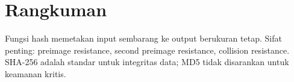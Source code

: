 \section*{Rangkuman}
Fungsi hash memetakan input sembarang ke output berukuran tetap. Sifat penting: preimage resistance, second preimage resistance, collision resistance. SHA-256 adalah standar untuk integritas data; MD5 tidak disarankan untuk keamanan kritis.
